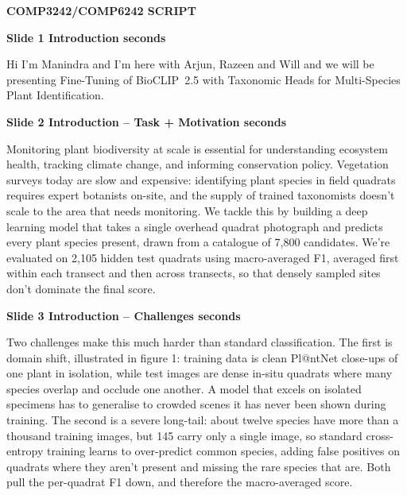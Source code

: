 \documentclass[11pt]{article}
\begin{document}
{\LARGE\bfseries COMP3242/COMP6242 SCRIPT}

\vspace{4pt}

\noindent\textbf{Slide 1 \quad Introduction  seconds}

Hi I'm Manindra and I'm here with Arjun, Razeen and Will and we will be presenting
Fine-Tuning of BioCLIP~2.5 with Taxonomic Heads for Multi-Species Plant
Identification.

\vspace{6pt}

\noindent\textbf{Slide 2 \quad Introduction -- Task + Motivation  seconds}

Monitoring plant biodiversity at scale is essential for understanding ecosystem
health, tracking climate change, and informing conservation policy. Vegetation
surveys today are slow and expensive: identifying plant species in field
quadrats requires expert botanists on-site, and the supply of trained
taxonomists doesn't scale to the area that needs monitoring. We tackle this by
building a deep learning model that takes a single overhead quadrat photograph
and predicts every plant species present, drawn from a catalogue of 7,800
candidates. We're evaluated on 2,105 hidden test quadrats using macro-averaged
F1, averaged first within each transect and then across transects, so that
densely sampled sites don't dominate the final score.

\vspace{6pt}

\noindent\textbf{Slide 3 \quad Introduction -- Challenges  seconds}

Two challenges make this much harder than standard classification. The first
is domain shift, illustrated in figure 1: training data is clean Pl@ntNet
close-ups of one plant in isolation, while test images are dense in-situ
quadrats where many species overlap and occlude one another. A model that
excels on isolated specimens has to generalise to crowded scenes it has never
been shown during training. The second is a severe long-tail: about twelve
species have more than a thousand training images, but 145 carry only a single
image, so standard cross-entropy training learns to over-predict common
species, adding false positives on quadrats where they aren't present and
missing the rare species that are. Both pull the per-quadrat F1 down, and
therefore the macro-averaged score.

\vspace{6pt}
\end{document}
